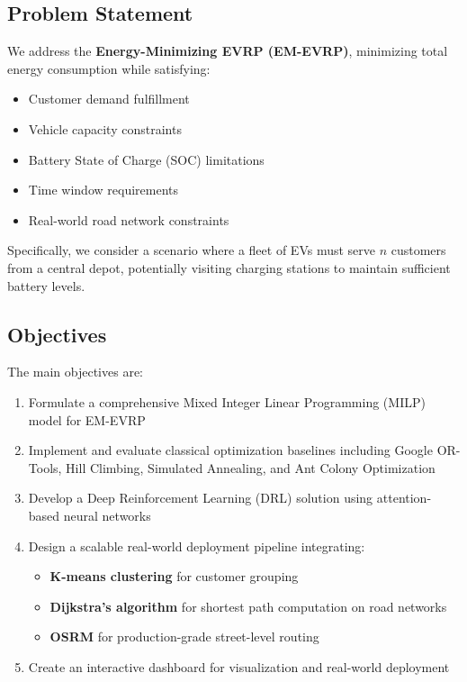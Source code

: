 \documentclass[11pt,a4paper]{article}
\begin{document}
\subsection{Problem Statement}

We address the \textbf{Energy-Minimizing EVRP (EM-EVRP)}, minimizing total energy consumption while satisfying:
\begin{itemize}
    \item Customer demand fulfillment
    \item Vehicle capacity constraints
    \item Battery State of Charge (SOC) limitations
    \item Time window requirements
    \item Real-world road network constraints
\end{itemize}

Specifically, we consider a scenario where a fleet of EVs must serve $n$ customers from a central depot, potentially visiting charging stations to maintain sufficient battery levels.

\subsection{Objectives}

The main objectives are:
\begin{enumerate}
    \item Formulate a comprehensive Mixed Integer Linear Programming (MILP) model for EM-EVRP
    \item Implement and evaluate classical optimization baselines including Google OR-Tools, Hill Climbing, Simulated Annealing, and Ant Colony Optimization
    \item Develop a Deep Reinforcement Learning (DRL) solution using attention-based neural networks
    \item Design a scalable real-world deployment pipeline integrating:
    \begin{itemize}
        \item \textbf{K-means clustering} for customer grouping
        \item \textbf{Dijkstra's algorithm} for shortest path computation on road networks
        \item \textbf{OSRM} for production-grade street-level routing
    \end{itemize}
    \item Create an interactive dashboard for visualization and real-world deployment
\end{enumerate}
\end{document}
